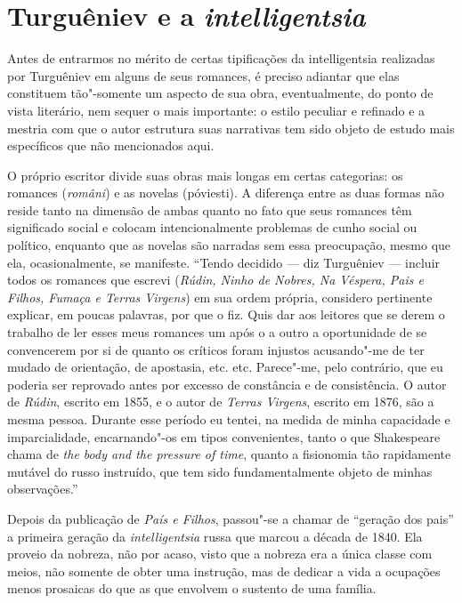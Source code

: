 \section{Turguêniev e a \emph{intelligentsia}}

Antes de entrarmos no mérito de certas tipificações da intelligentsia
realizadas por Turguêniev em alguns de seus romances, é preciso adiantar
que elas constituem tão"-somente um aspecto de sua obra, eventualmente,
do ponto de vista literário, nem sequer o mais importante: o estilo
peculiar e refinado e a mestria com que o autor estrutura suas
narrativas tem sido objeto de estudo mais específicos que não
mencionados aqui.

O próprio escritor divide suas obras mais longas em certas categorias:
os romances (\emph{români}) e as novelas (póviesti). A diferença entre
as duas formas não reside tanto na dimensão de ambas quanto no fato que
seus romances têm significado social e colocam intencionalmente
problemas de cunho social ou político, enquanto que as novelas são
narradas sem essa preocupação, mesmo que ela, ocasionalmente, se
manifeste. ``Tendo decidido --- diz Turguêniev --- incluir todos os
romances que escrevi (\emph{Rúdin, Ninho de Nobres, Na Véspera, Pais e
Filhos, Fumaça e Terras Virgens}) em sua ordem própria, considero
pertinente explicar, em poucas palavras, por que o fiz. Quis dar aos
leitores que se derem o trabalho de ler esses meus romances um após o a
outro a oportunidade de se convencerem por si de quanto os críticos
foram injustos acusando"-me de ter mudado de orientação, de apostasia,
etc. etc. Parece"-me, pelo contrário, que eu poderia ser reprovado antes
por excesso de constância e de consistência. O autor de \emph{Rúdin},
escrito em 1855, e o autor de \emph{Terras Virgens}, escrito em 1876,
são a mesma pessoa. Durante esse período eu tentei, na medida de minha
capacidade e imparcialidade, encarnando"-os em tipos convenientes, tanto
o que Shakespeare chama de \emph{the body and the pressure of time},
quanto a fisionomia tão rapidamente mutável do russo instruído, que tem
sido fundamentalmente objeto de minhas observações.''

Depois da publicação de \emph{País e Filhos}, passou"-se a chamar de
``geração dos pais'' a primeira geração da \emph{intelligentsia} russa
que marcou a década de 1840. Ela proveio da nobreza, não por acaso,
visto que a nobreza era a única classe com meios, não somente de obter
uma instrução, mas de dedicar a vida a ocupações menos prosaicas do que
as que envolvem o sustento de uma família.

